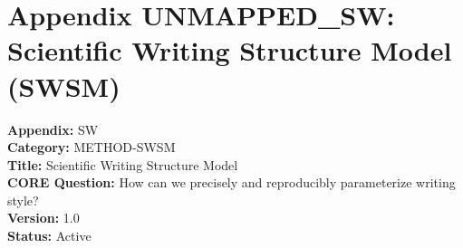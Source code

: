 %
%
%

\section*{Appendix UNMAPPED_SW: Scientific Writing Structure Model (SWSM)}
\label{app:sw}


\begin{tcolorbox}[colback=blue!5!white, colframe=blue!75!black, title=Appendix Metadata]
\textbf{Appendix:} SW \\
\textbf{Category:} METHOD-SWSM \\
\textbf{Title:} Scientific Writing Structure Model \\
\textbf{CORE Question:} How can we precisely and reproducibly parameterize writing style? \\
\textbf{Version:} 1.0 \\
\textbf{Status:} Active
\end{tcolorbox}


